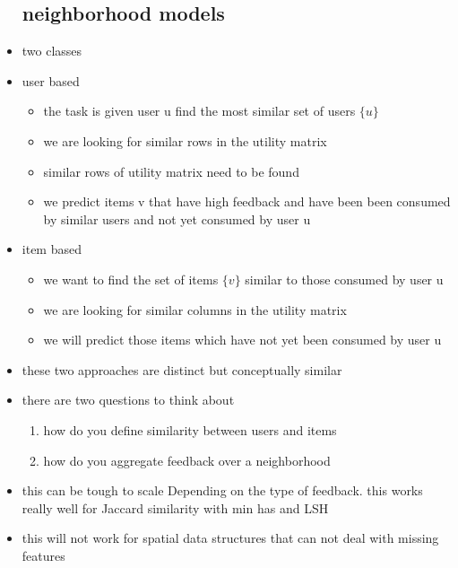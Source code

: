 \documentclass{article}
\begin{document}
\begin{itemize}
\subsection*{neighborhood models}
\item two classes 
\item user based 
\begin{itemize}
    \item the task is given user u find the most similar set of users $\{u\}$
    \item we are looking for similar rows in the utility matrix
    \item similar rows of utility matrix need to be found 
    \item we predict items v that have high feedback and have been been consumed by similar users and not yet consumed by user u 
\end{itemize}
\item item based 

\begin{itemize}
    \item we want to find the set of items $\{v\}$ similar to those consumed by user u 
    \item we are looking for similar columns in the utility matrix
    \item we will predict those items which have not yet been consumed by user u 
\end{itemize}
\item these two approaches are distinct but conceptually similar
\item there are two questions to think about 
\begin{enumerate}
    \item how do you define similarity between users and items
    \item how do you aggregate feedback over a neighborhood
\end{enumerate}
\item this can be tough to scale Depending on the type of feedback. this works really well for Jaccard similarity with min has and LSH 
\item this will not work for spatial data structures that can not deal with missing features 

\end{itemize}
\end{document}
